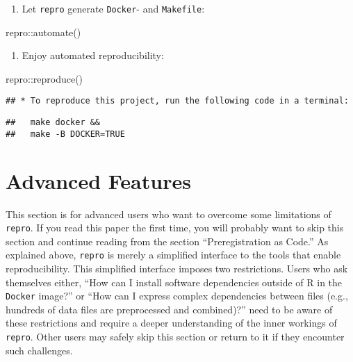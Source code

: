 \documentclass[psych,tutorial,submit,moreauthors,pdftex]{mdpi}
\providecommand{\tightlist}{%
  \setlength{\itemsep}{0pt}\setlength{\parskip}{4pt}}
\newenvironment{Shaded}{\begin{snugshade}}{\end{snugshade}}
\newcommand{\FunctionTok}[1]{\textcolor[rgb]{0.00,0.00,0.00}{#1}}
\newcommand{\NormalTok}[1]{#1}
\newcommand{\SpecialCharTok}[1]{\textcolor[rgb]{0.00,0.00,0.00}{#1}}
\begin{document}
\begin{enumerate}
\def\labelenumi{\arabic{enumi}.}
\setcounter{enumi}{3}
\tightlist
\item
  Let \texttt{repro} generate \texttt{Docker}- and \texttt{Makefile}:
\end{enumerate}

\begin{Shaded}
\begin{Highlighting}[]
\NormalTok{repro}\SpecialCharTok{::}\FunctionTok{automate}\NormalTok{()}
\end{Highlighting}
\end{Shaded}

\begin{enumerate}
\def\labelenumi{\arabic{enumi}.}
\setcounter{enumi}{4}
\tightlist
\item
  Enjoy automated reproducibility:
\end{enumerate}

\begin{Shaded}
\begin{Highlighting}[]
\NormalTok{repro}\SpecialCharTok{::}\FunctionTok{reproduce}\NormalTok{()}
\end{Highlighting}
\end{Shaded}

\begin{verbatim}
## * To reproduce this project, run the following code in a terminal:
\end{verbatim}

\begin{verbatim}
##   make docker &&
##   make -B DOCKER=TRUE
\end{verbatim}

\hypertarget{advanced-features}{%
\section{Advanced Features}\label{advanced-features}}

This section is for advanced users who want to overcome some limitations
of \texttt{repro}. If you read this paper the first time, you will
probably want to skip this section and continue reading from the section
``Preregistration as Code.'' As explained above, \texttt{repro} is
merely a simplified interface to the tools that enable reproducibility.
This simplified interface imposes two restrictions. Users who ask
themselves either, ``How can I install software dependencies outside of
R in the \texttt{Docker} image?'' or ``How can I express complex
dependencies between files (e.g., hundreds of data files are
preprocessed and combined)?'' need to be aware of these restrictions and
require a deeper understanding of the inner workings of \texttt{repro}.
Other users may safely skip this section or return to it if they
encounter such challenges.
\end{document}
